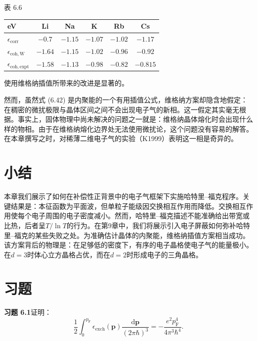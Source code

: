\begin{center}
表 6.6\\[4pt]
\begin{tabular}{lccccc}
\toprule
eV & Li & Na & K & Rb & Cs\\
\midrule
$\epsilon_{\mathrm{corr}}$ & $-0.7$ & $-1.15$ & $-1.07$ & $-1.02$ & $-1.17$\\
$\epsilon_{\mathrm{coh,W}}$ & $-1.64$ & $-1.15$ & $-1.02$ & $-0.96$ & $-0.92$\\
$\epsilon_{\mathrm{coh,expt}}$ & $-1.58$ & $-1.13$ & $-0.98$ & $-0.82$ & $-0.815$\\
\bottomrule
\end{tabular}
\end{center}

使用维格纳插值所带来的改进是显著的。

然而，虽然式 (6.42) 是内聚能的一个有用插值公式，维格纳方案却隐含地假定：在稠密的微扰极限与晶体区间之间不会出现电子气的新相。这一假定其实毫无根据。事实上，固体物理中尚未解决的问题之一就是：维格纳晶体熔化时会出现什么样的物相。由于在维格纳熔化边界处无法使用微扰论，这个问题没有容易的解答。在本章撰写之时，对稀薄二维电子气的实验（K1999）表明这一相是奇异的。

\section*{小结}

本章我们展示了如何在补偿性正背景中的电子气框架下实施哈特里–福克程序。关键结果是：本征函数为平面波，但单粒子能级因交换相互作用而降低。交换相互作用使每个电子周围的电子密度减小。然而，哈特里–福克描述不能准确给出带宽或比热，后者呈$T/\ln T$的行为。在第9章中，我们将展示引入电子屏蔽如何弥补哈特里–福克的某些失败之处。为准确估计晶体的内聚能，维格纳插值方案相当成功。该方案背后的物理是：在足够低的密度下，有序的电子晶格使电子气的能量极小。在$d = 3$时体心立方晶格占优，而在$d = 2$时形成电子的三角晶格。

\section*{习题}

\textbf{习题 6.1}\quad 证明：
\begin{equation*}
\frac{1}{2}\int_0^{p_{\mathrm{F}}} \epsilon_{\mathrm{exch}}(\mathbf{p})\frac{\mathrm{d}\mathbf{p}}{(2\pi\hbar)^3} = -\frac{e^2 p_{\mathrm{F}}^4}{4\pi^3\hbar^4}.
\end{equation*}

